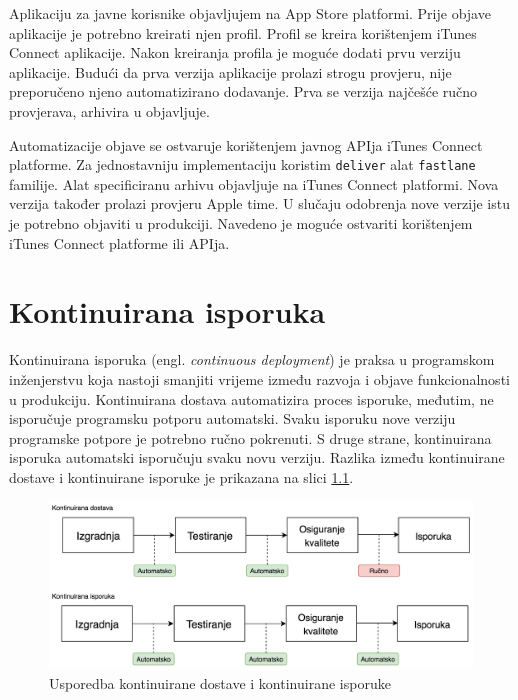 \documentclass[times, utf8, diplomski, numeric]{fer}
\newcommand{\eng}[1]{(engl. \textit{#1})}
\begin{document}
Aplikaciju za javne korisnike objavljujem na App Store platformi. Prije objave aplikacije je potrebno kreirati njen profil. Profil se kreira korištenjem iTunes Connect aplikacije. Nakon kreiranja profila je moguće dodati prvu verziju aplikacije. Budući da prva verzija aplikacije prolazi strogu provjeru, nije preporučeno njeno automatizirano dodavanje. Prva se verzija najčešće ručno provjerava, arhivira u objavljuje.

Automatizacije objave se ostvaruje korištenjem javnog APIja iTunes Connect platforme. Za jednostavniju implementaciju koristim \verb|deliver| alat \verb|fastlane| familije. Alat specificiranu arhivu objavljuje na iTunes Connect platformi. Nova verzija također prolazi provjeru Apple time. U slučaju odobrenja nove verzije istu je potrebno objaviti u produkciji. Navedeno je moguće ostvariti korištenjem iTunes Connect platforme ili APIja.



\chapter{Kontinuirana isporuka} \label{header:KontinuiranaIsporuka}

Kontinuirana isporuka \eng{continuous deployment} je praksa u programskom inženjerstvu koja nastoji smanjiti vrijeme između razvoja i objave funkcionalnosti u produkciju. Kontinuirana dostava automatizira proces isporuke, međutim, ne isporučuje programsku potporu automatski. Svaku isporuku nove verziju programske potpore je potrebno ručno pokrenuti. S druge strane, kontinuirana isporuka automatski isporučuju svaku novu verziju. Razlika između kontinuirane dostave i kontinuirane isporuke je prikazana na slici \ref{fig:CDDifferences}\citep{cd:whats_the_diff}.

\begin{figure}
\centering
\includegraphics[scale=0.55]{CDDifferences}
\caption{Usporedba kontinuirane dostave i kontinuirane isporuke}
\label{fig:CDDifferences}
\end{figure}
\end{document}
